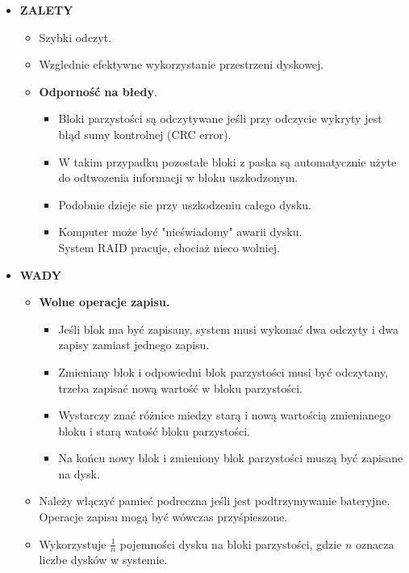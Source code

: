 \documentclass[a5paper,6pt]{article}
\begin{document}
    \begin{itemize}
        \item \textbf{ZALETY}
        \begin{itemize}
            \item Szybki odczyt.
            \item Wzglednie efektywne wykorzystanie przestrzeni dyskowej.
            \item \textbf{Odporność na błedy}.
            \begin{itemize}
                \item Bloki parzystości są odczytywane jeśli przy odczycie
                      wykryty jest błąd sumy kontrolnej (CRC error).
                \item W takim przypadku pozostałe bloki z paska są automatycznie
                      użyte do odtwozenia informacji w bloku uszkodzonym.
                \item Podobnie dzieje sie przy uszkodzeniu całego dysku.
                \item Komputer może być "nieświadomy" awarii dysku.\\
                      System RAID pracuje, chociaż nieco wolniej.
            \end{itemize}
        \end{itemize}

        \item \textbf{WADY}
        \begin{itemize}
            \item \textbf{Wolne operacje zapisu.}
            \begin{itemize}
                \item Jeśli blok ma być zapisany, system musi wykonać dwa
                      odczyty i dwa zapisy zamiast jednego zapisu.
                \item Zmieniany blok i odpowiedni blok parzystości musi być
                      odczytany, trzeba zapisać nową wartość w bloku
                      parzystości.
                \item Wystarczy znać różnice miedzy starą i nową wartością
                      zmienianego bloku i starą watość bloku parzystości.
                \item Na końcu nowy blok i zmieniony blok parzystości muszą
                      być zapisane na dysk.
            \end{itemize}
            \item Należy włączyć pamieć podreczna jeśli jest podtrzymywanie
                  bateryjne. Operacje zapisu mogą być wówczas przyśpieszone.
            \item Wykorzystuje $\frac{1}{n}$ pojemności dysku na bloki
                  parzystości, gdzie $n$ oznacza liczbe dysków w systemie.
        \end{itemize}


\end{itemize}
\end{document}
